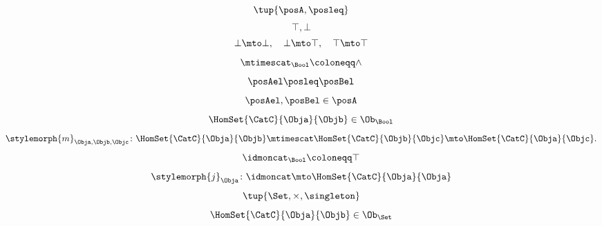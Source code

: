 {\begin{forslides}
\begin{equation*}
            \label{eq:poset_bool_a}
            \tup{\posA,\posleq}
        \end{equation*}
        \begin{equation*}
            \label{eq:poset_bool_b}
            \top,\bot
        \end{equation*}
        \begin{equation*}
            \label{eq:poset_bool_c}
            \bot\mto \bot, \quad \bot\mto \top, \quad \top\mto \top
        \end{equation*}
        \begin{equation*}
            \label{eq:poset_bool_d}
            \mtimescat_\Bool \coloneqq \wedge
        \end{equation*}
        \begin{equation*}
            \label{eq:poset_bool_e}
            \posAel\posleq \posBel
        \end{equation*}
        \begin{equation*}
            \label{eq:poset_bool_f}
            \posAel,\posBel \in \posA
        \end{equation*}
        \begin{equation*}
            \label{eq:poset_bool_g}
            \HomSet{\CatC}{\Obja}{\Objb}\in \Ob_\Bool
        \end{equation*}
        \begin{equation*}
            \label{eq:poset_bool_h}
            \stylemorph{m}_{\Obja,\Objb,\Objc}\colon \HomSet{\CatC}{\Obja}{\Objb}\mtimescat \HomSet{\CatC}{\Objb}{\Objc}\mto \HomSet{\CatC}{\Obja}{\Objc}.
        \end{equation*}
        \begin{equation*}
            \label{eq:poset_bool_i}
            \idmoncat_\Bool \coloneqq \top
        \end{equation*}
        \begin{equation*}
            \label{eq:poset_bool_k}
            \stylemorph{j}_\Obja\colon \idmoncat \mto \HomSet{\CatC}{\Obja}{\Obja}
        \end{equation*}
        \begin{equation*}
            \label{eq:poset_bool_j}
            \tup{\Set, \times, \singleton}
        \end{equation*}
        \begin{equation*}
            \label{eq:poset_bool_l}
            \HomSet{\CatC}{\Obja}{\Objb}\in \Ob_\Set
        \end{equation*}
        \begin{equation*}

\end{equation*}
\end{forslides}}
